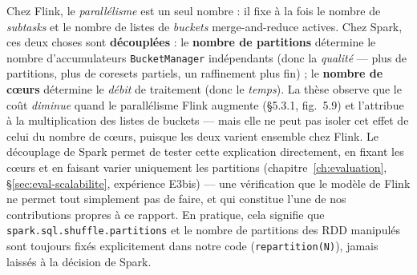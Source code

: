 Chez Flink, le \emph{parallélisme} est un seul nombre : il fixe à la fois le
nombre de \emph{subtasks} et le nombre de listes de \emph{buckets}
merge-and-reduce actives. Chez Spark, ces deux choses sont
\textbf{découplées} : le \textbf{nombre de partitions} détermine le nombre
d'accumulateurs \texttt{BucketManager} indépendants (donc la
\emph{qualité} --- plus de partitions, plus de coresets partiels, un
raffinement plus fin) ; le \textbf{nombre de c\oe{}urs} détermine le
\emph{débit} de traitement (donc le \emph{temps}). La thèse observe que le
coût \emph{diminue} quand le parallélisme Flink augmente (§5.3.1,
fig.~5.9) et l'attribue à la multiplication des listes de buckets --- mais
elle ne peut pas isoler cet effet de celui du nombre de c\oe{}urs, puisque les
deux varient ensemble chez Flink. Le découplage de Spark permet de tester
cette explication directement, en fixant les c\oe{}urs et en faisant varier
uniquement les partitions (chapitre~\ref{ch:evaluation},
§\ref{sec:eval-scalabilite}, expérience E3bis) --- une vérification que le
modèle de Flink ne permet tout simplement pas de faire, et qui constitue
l'une de nos contributions propres à ce rapport. En pratique, cela signifie
que \texttt{spark.sql.shuffle.partitions} et le nombre de partitions des RDD
manipulés sont toujours fixés explicitement dans notre code
(\texttt{repartition(N)}), jamais laissés à la décision de Spark.
